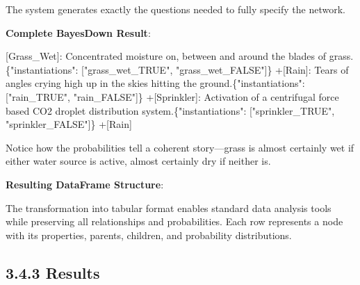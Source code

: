 \documentclass[
  11pt,
  letterpaper,
  openany]{book}
\newenvironment{Shaded}{\begin{snugshade}}{\end{snugshade}}
\newcommand{\CommentTok}[1]{\textcolor[rgb]{0.37,0.37,0.37}{#1}}
\newcommand{\NormalTok}[1]{\textcolor[rgb]{0.00,0.23,0.31}{#1}}
\newcommand{\OtherTok}[1]{\textcolor[rgb]{0.00,0.23,0.31}{#1}}
\begin{document}
\begin{landscape}
The system generates exactly the questions needed to fully specify the
network.

\textbf{Complete BayesDown Result}:

\begin{Shaded}
\begin{Highlighting}[]
\OtherTok{[Grass\_Wet]: }\NormalTok{Concentrated moisture on, between and around the blades of grass.\{"instantiations": }\CommentTok{[}\OtherTok{"grass\_wet\_TRUE", "grass\_wet\_FALSE"}\CommentTok{]}\NormalTok{\}    }
\NormalTok{    +}\CommentTok{[}\OtherTok{Rain}\CommentTok{]}\NormalTok{: Tears of angles crying high up in the skies hitting the ground.\{"instantiations": }\CommentTok{[}\OtherTok{"rain\_TRUE", "rain\_FALSE"}\CommentTok{]}\NormalTok{\}}
\NormalTok{    +}\CommentTok{[}\OtherTok{Sprinkler}\CommentTok{]}\NormalTok{: Activation of a centrifugal force based CO2 droplet distribution system.\{"instantiations": }\CommentTok{[}\OtherTok{"sprinkler\_TRUE", "sprinkler\_FALSE"}\CommentTok{]}\NormalTok{\}}
\NormalTok{        +}\CommentTok{[}\OtherTok{Rain}\CommentTok{]}
\end{Highlighting}
\end{Shaded}

Notice how the probabilities tell a coherent story---grass is almost
certainly wet if either water source is active, almost certainly dry if
neither is.

\textbf{Resulting DataFrame Structure}:

The transformation into tabular format enables standard data analysis
tools while preserving all relationships and probabilities. Each row
represents a node with its properties, parents, children, and
probability distributions.

\subsection{3.4.3 Results}\label{sec-rsg-results}


\end{landscape}
\end{document}
